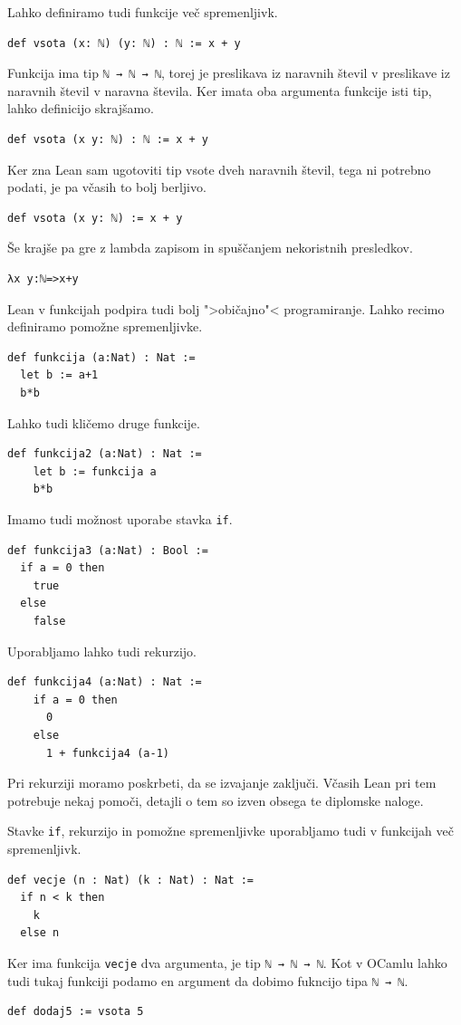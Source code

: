 \documentclass[mat1]{fmfdelo}
\begin{document}
Lahko definiramo tudi funkcije več spremenljivk.
\begin{lstlisting}
def vsota (x: ℕ) (y: ℕ) : ℕ := x + y
\end{lstlisting}
Funkcija ima tip \lstinline{ℕ → ℕ → ℕ}, torej je preslikava iz naravnih števil v preslikave iz naravnih števil v naravna števila.
Ker imata oba argumenta funkcije isti tip, lahko definicijo skrajšamo.
\begin{lstlisting}
def vsota (x y: ℕ) : ℕ := x + y
\end{lstlisting}
Ker zna Lean sam ugotoviti tip vsote dveh naravnih števil, tega ni potrebno podati, je pa včasih to bolj berljivo.
\begin{lstlisting}
def vsota (x y: ℕ) := x + y
\end{lstlisting}
Še krajše pa gre z lambda zapisom in spuščanjem nekoristnih presledkov.
\begin{lstlisting}
λx y:ℕ=>x+y
\end{lstlisting}

Lean v funkcijah podpira tudi bolj ">običajno"< programiranje. Lahko recimo definiramo pomožne spremenljivke.
\begin{lstlisting}
def funkcija (a:Nat) : Nat := 
  let b := a+1
  b*b
\end{lstlisting}

Lahko tudi kličemo druge funkcije.
\begin{lstlisting}
def funkcija2 (a:Nat) : Nat :=
    let b := funkcija a
    b*b
\end{lstlisting}

Imamo tudi možnost uporabe stavka \lstinline{if}.
\begin{lstlisting}
def funkcija3 (a:Nat) : Bool :=
  if a = 0 then
    true
  else
    false
\end{lstlisting}
Uporabljamo lahko tudi rekurzijo.
\begin{lstlisting}
def funkcija4 (a:Nat) : Nat :=
    if a = 0 then
      0
    else
      1 + funkcija4 (a-1)
\end{lstlisting}
Pri rekurziji moramo poskrbeti, da se izvajanje zaključi. Včasih Lean pri tem potrebuje nekaj pomoči, detajli o tem so izven obsega te diplomske naloge.

Stavke \lstinline{if}, rekurzijo in pomožne spremenljivke uporabljamo tudi v funkcijah več spremenljivk.
\begin{lstlisting}
def vecje (n : Nat) (k : Nat) : Nat :=
  if n < k then
    k
  else n
\end{lstlisting}
Ker ima funkcija \lstinline{vecje} dva argumenta, je tip \lstinline{ℕ → ℕ → ℕ}. Kot v OCamlu lahko tudi tukaj funkciji podamo en argument 
da dobimo fukncijo tipa \lstinline{ℕ → ℕ}.
\begin{lstlisting}
def dodaj5 := vsota 5
\end{lstlisting}
\end{document}
